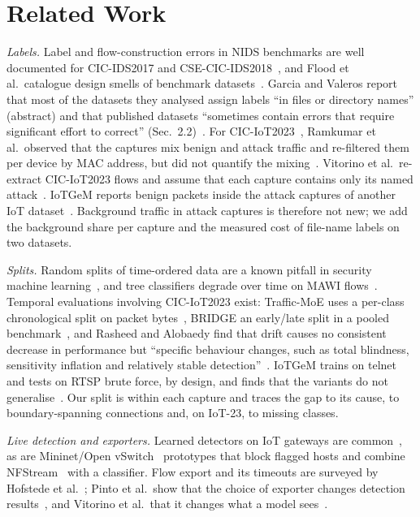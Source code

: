 \section{Related Work}\label{sec:related}

\emph{Labels.} Label and flow-construction errors in NIDS benchmarks are well documented for CIC-IDS2017 and CSE-CIC-IDS2018~\cite{engelen2021troubleshooting,liu2022error}, and Flood et al.\ catalogue design smells of benchmark datasets~\cite{flood2024smells}. Garcia and Valeros report that most of the datasets they analysed assign labels ``in files or directory names'' (abstract) and that published datasets ``sometimes contain errors that require significant effort to correct'' (Sec.~2.2)~\cite{garcia2023labeling}. For CIC-IoT2023~\cite{neto2023ciciot2023}, Ramkumar et al.\ observed that the captures mix benign and attack traffic and re-filtered them per device by MAC address, but did not quantify the mixing~\cite{ramkumar2024diagnosing}. Vitorino et al.\ re-extract CIC-IoT2023 flows and assume that each capture contains only its named attack~\cite{vitorino2025revisiting}. IoTGeM reports benign packets inside the attack captures of another IoT dataset~\cite{kostas2024iotgem}. Background traffic in attack captures is therefore not new; we add the background share per capture and the measured cost of file-name labels on two datasets.

\emph{Splits.} Random splits of time-ordered data are a known pitfall in security machine learning~\cite{arp2022dos,pendlebury2019tesseract,apruzzese2023sok}, and tree classifiers degrade over time on MAWI flows~\cite{schraven2026mawiflow}. Temporal evaluations involving CIC-IoT2023 exist: Traffic-MoE uses a per-class chronological split on packet bytes~\cite{zhou2026trafficmoe}, BRIDGE an early/late split in a pooled benchmark~\cite{bridge2026tchnet}, and Rasheed and Alobaedy find that drift causes no consistent decrease in performance but ``specific behaviour changes, such as total blindness, sensitivity inflation and relatively stable detection''~\cite{rasheed2026drift}. IoTGeM trains on telnet and tests on RTSP brute force, by design, and finds that the variants do not generalise~\cite{kostas2024iotgem}. Our split is within each capture and traces the gap to its cause, to boundary-spanning connections and, on IoT-23, to missing classes.

\emph{Live detection and exporters.} Learned detectors on IoT gateways are common~\cite{realguard2022}, as are Mininet/Open vSwitch~\cite{lantz2010mininet,pfaff2015ovs} prototypes that block flagged hosts and combine NFStream~\cite{aouini2022nfstream} with a classifier. Flow export and its timeouts are surveyed by Hofstede et al.~\cite{hofstede2014flow}; Pinto et al.\ show that the choice of exporter changes detection results~\cite{pinto2025flowexporter,pinto2025hera}, and Vitorino et al.\ that it changes what a model sees~\cite{vitorino2025revisiting}.

